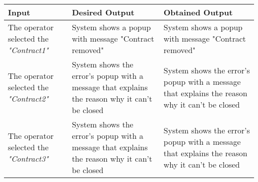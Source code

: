 {{{\begin{center}
			\begin{tabular}{|p{4cm}|p{5cm}|p{5cm}|}
			\hline
			\centering \vspace{1mm} \bfseries{Input} \vspace{1mm} & \vspace{1mm} \bfseries{Desired Output} \vspace{1mm} & \vspace{1mm} \bfseries{Obtained Output} \vspace{1mm}\\
			\hline
				\vspace{1mm} The operator selected the \itshape{"Contract1"} \vspace{1mm} &
				\vspace{1mm} System shows a popup with message "Contract removed" \vspace{1mm} & 
				\vspace{1mm} System shows a popup with message "Contract removed" \vspace{1mm} \\
			\hline
				\vspace{1mm} The operator selected the \itshape{"Contract2"} \vspace{1mm} &
				\vspace{1mm} System shows the error's popup with a message that explains the reason why it can't be closed \vspace{1mm} & 
				\vspace{1mm} System shows the error's popup with a message that explains the reason why it can't be closed \vspace{1mm} \\
			\hline
				\vspace{1mm} The operator selected the \itshape{"Contract3"} \vspace{1mm} &
				\vspace{1mm} System shows the error's popup with a message that explains the reason why it can't be closed \vspace{1mm} & 
				\vspace{1mm} System shows the error's popup with a message that explains the reason why it can't be closed \vspace{1mm} \\
			\hline
			\end{tabular}
			\end{center}
		}
		\clearpage

}}
